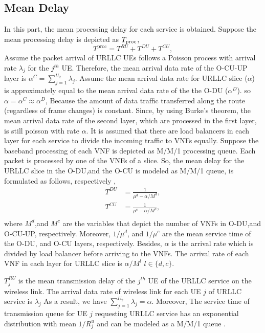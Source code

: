\documentclass[conference]{IEEEtran}
\begin{document}
\subsection{Mean Delay}
In this part, the mean processing delay for each service is obtained.
Suppose the mean processing delay is depicted as $T_{\text{\text{proc}}}$,
\begin{equation}
T^{\text{proc}} =  T^{RU} + T^{DU} + T^{CU},
\end{equation}
Assume the packet arrival of URLLC UEs follows a Poisson process with arrival rate $\lambda_{j}$ for the $j^{th}$ UE.
Therefore, the mean arrival data rate of the O-CU-UP layer is $\alpha^C = \sum_{j=1}^{U_2}\lambda_{j}$.
Assume the mean arrival data rate for URLLC slice ($\alpha$) is approximately equal to the mean arrival data rate of the  the O-DU ($\alpha^D$). so $\alpha = \alpha^C \approx \alpha^D$,
Because the amount of data traffic transferred along the route (regardless of frame changes) is constant.
Since, by using Burke’s theorem, the mean arrival data rate of the second layer, which are processed in the first layer, is still poisson with rate $\alpha$.
It is assumed that there are load balancers in each layer for each service to divide the incoming traffic to VNFs equally. %
Suppose the baseband processing of each VNF is depicted as M/M/1 processing queue.
Each packet is processed by one of the VNFs of a slice. So, the mean delay for the URLLC slice in the O-DU,and the O-CU is modeled as M/M/1 queue, is formulated as follows, respectively \cite{SystemCostMinimization,luong2018joint,luong2018novel},
\begin{equation}
\begin{split}
T^{DU} &= \frac{1}{\mu^d - \alpha/{M^{d}}},\\
T^{CU} &= \frac{1}{\mu^c - \alpha/{M^{c}}},\\
\end{split}
\end{equation}
where $M^{d}$,and $M^{c}$ are the variables that depict the number of VNFs in O-DU,and O-CU-UP, respectively. 
Moreover, $1/\mu^d$, and $1/\mu^c$ are the mean service time of the O-DU, and O-CU layers, respectively.
Besides, $\alpha$ is the  arrival rate which is divided
by load balancer before arriving to the VNFs. The arrival rate of each VNF in each layer for URLLC slice  is $\alpha/{M^{l}}$ $ l \in \{d,c\}$.

$T_{j}^{RU}$ is the mean transmission delay of the $j^{th}$ UE of the URLLC service on the wireless link.
 The arrival data rate of wireless link for each UE $j$ of URLLC service is $\lambda_j$
As a result, we have $\sum_{j = 1}^{U_2} \lambda_{j} = \alpha$.
Moreover, The service time of transmission queue for UE $j$ requesting URLLC service has
an exponential distribution with mean $1/R_{j}^u$ and can be modeled as a M/M/1 queue \cite{SystemCostMinimization,luong2018joint,luong2018novel}.
 
\end{document}
